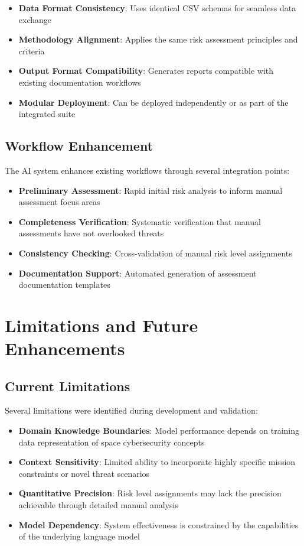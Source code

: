 \documentclass[binding=0.6cm]{sapthesis}
\begin{document}
\begin{itemize}
    \item \textbf{Data Format Consistency}: Uses identical CSV schemas for seamless data exchange
    \item \textbf{Methodology Alignment}: Applies the same risk assessment principles and criteria
    \item \textbf{Output Format Compatibility}: Generates reports compatible with existing documentation workflows
    \item \textbf{Modular Deployment}: Can be deployed independently or as part of the integrated suite
\end{itemize}

\subsection{Workflow Enhancement}

The AI system enhances existing workflows through several integration points:

\begin{itemize}
    \item \textbf{Preliminary Assessment}: Rapid initial risk analysis to inform manual assessment focus areas
    \item \textbf{Completeness Verification}: Systematic verification that manual assessments have not overlooked threats
    \item \textbf{Consistency Checking}: Cross-validation of manual risk level assignments
    \item \textbf{Documentation Support}: Automated generation of assessment documentation templates
\end{itemize}

\section{Limitations and Future Enhancements}

\subsection{Current Limitations}

Several limitations were identified during development and validation:

\begin{itemize}
    \item \textbf{Domain Knowledge Boundaries}: Model performance depends on training data representation of space cybersecurity concepts
    \item \textbf{Context Sensitivity}: Limited ability to incorporate highly specific mission constraints or novel threat scenarios
    \item \textbf{Quantitative Precision}: Risk level assignments may lack the precision achievable through detailed manual analysis
    \item \textbf{Model Dependency}: System effectiveness is constrained by the capabilities of the underlying language model
\end{itemize}
\end{document}
